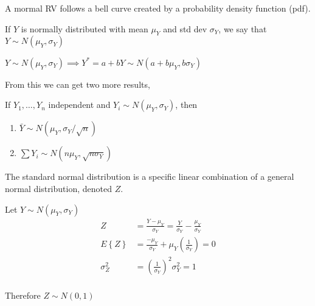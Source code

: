 \documentclass[10pt]{article}
\newcommand{\define}[1]{\colorbox{Thistle2}{#1}}
\newcommand{\emphas}[1]{\colorbox{DarkSeaGreen2}{#1}}
\newcommand{\mean}[1]{\mu_{#1}}
\renewcommand{\exp}[1]{E\left\{#1\right\}} %
\newcommand{\subvar}[1]{\sigma^2_{#1}} %
\newcommand{\subdev}[1]{\sigma_{#1}}
\begin{document}
\begin{multicols}{3}
    A mormal RV follows a bell curve created by a \emphas{probability density function (pdf)}.

    If $Y$ is normally distributed with mean $\mean{Y}$ and std dev $\subdev{Y}$, we say that $Y \sim N(\mean{Y}, \subdev{Y})$

    $Y \sim N(\mean{Y}, \subdev{Y}) \implies Y^* = a + bY \sim N(a + b\mean{Y}, b\subdev{Y})$

    From this we can get two more results, 

    If $Y_1, \dots, Y_n$ independent and $Y_i \sim N(\mean{Y}, \subdev{Y})$, then

    \begin{enumerate}
        \item $\bar Y \sim N(\mean{Y}, \subdev{Y}/\sqrt{n})$
        \item $\sum Y_i \sim N(n \mean{Y}, \sqrt{n \subdev{Y}})$
    \end{enumerate}

    The \define{standard normal distribution} is a specific linear combination of a general normal distribution, denoted $Z$. 

    Let $Y \sim N(\mean{Y}, \subdev{Y})$
    \begin{align*}
        Z & = \frac{Y - \mean{Y}}{\subdev{Y}} = \frac{Y}{\subdev{Y}} - \frac{\mean{Y}}{\subdev{Y}} \\
        \exp{Z} & = \frac{-\mean{Y}}{\subdev{Y}} + \mean{Y} (\frac{1}{\subdev{Y}}) = 0 \\
        \subvar{Z} & = \left(\frac{1}{\subdev{Y}}\right)^2 \subvar{Y} = 1 \\
    \end{align*}

    Therefore $Z \sim N(0,1)$

\end{multicols}
\end{document}
